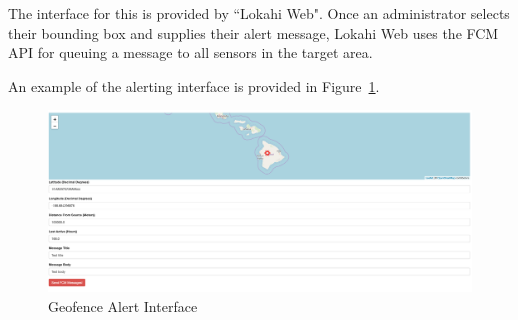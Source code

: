 The interface for this is provided by ``Lokahi Web". Once an administrator selects their bounding box and supplies their alert message, Lokahi Web uses the FCM API for queuing a message to all sensors in the target area.

An example of the alerting interface is provided in Figure~\ref{fig:fcm}.

\begin{figure}
	\centering
	\includegraphics[width=\linewidth]{figures/fcm.png}
	\caption{Geofence Alert Interface}
	\label{fig:fcm}
\end{figure}
